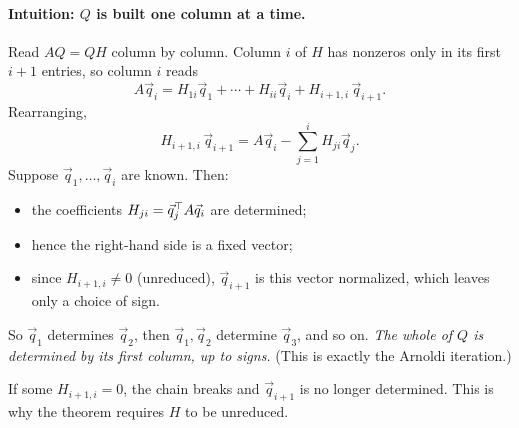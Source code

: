 \paragraph{Intuition: $Q$ is built one column at a time.} Read $AQ = QH$ column by column. Column $i$ of $H$ has nonzeros only in its first $i + 1$ entries, so column $i$ reads
\begin{equation*}
  A\vec{q}_i = H_{1i}\vec{q}_1 + \cdots + H_{ii}\vec{q}_i + H_{i+1,i}\,\vec{q}_{i+1}.
\end{equation*}
Rearranging,
\begin{equation*}
  H_{i+1,i}\,\vec{q}_{i+1} = A\vec{q}_i - \sum_{j=1}^{i}H_{ji}\vec{q}_j.
\end{equation*}
Suppose $\vec{q}_1, \dots, \vec{q}_i$ are known. Then:
\begin{itemize}
  \item the coefficients $H_{ji} = \vec{q}_j^\top A\vec{q}_i$ are determined;
  \item hence the right-hand side is a fixed vector;
  \item since $H_{i+1,i} \ne 0$ (unreduced), $\vec{q}_{i+1}$ is this vector normalized, which leaves only a choice of sign.
\end{itemize}
So $\vec{q}_1$ determines $\vec{q}_2$, then $\vec{q}_1, \vec{q}_2$ determine $\vec{q}_3$, and so on. \emph{The whole of $Q$ is determined by its first column, up to signs.} (This is exactly the Arnoldi iteration.)

If some $H_{i+1,i} = 0$, the chain breaks and $\vec{q}_{i+1}$ is no longer determined. This is why the theorem requires $H$ to be unreduced.

